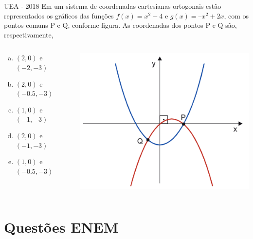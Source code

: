 \documentclass[11pt]{beamer}
\begin{document}
\begin{frame}{UEA - 2018}
    Em um sistema de coordenadas cartesianas ortogonais estão representados os gráficos das funções $f(x) = x^{2}-4$ e $g(x) = –x^{2}+2x$, com os pontos comuns P e Q, conforme figura. As coordenadas dos pontos P e Q são, respectivamente,

    \begin{columns}
        \begin{column}{0.4\textwidth}
            \begin{enumerate}[a)]
                \item $(2,0)$ e $(-2,-3)$  
                \item $(2,0)$ e $(-0.5,-3)$
                \item $(1,0)$ e $(-1,-3)$ 
                \item $(2,0)$ e $(-1,-3)$ %
                \item $(1,0)$ e $(-0.5,-3)$
            \end{enumerate}
        \end{column}

        \begin{column}{0.5\textwidth}
            \centering
            \includegraphics[width=0.8\linewidth]{imagens/uea-macro-2018.png}
        \end{column}
    \end{columns}
    
\end{frame}

\section{Questões ENEM}
\end{document}

